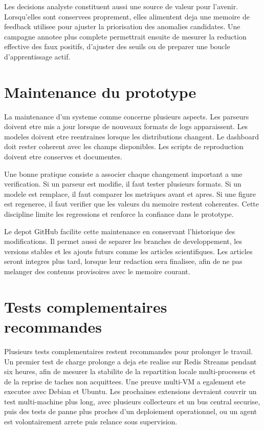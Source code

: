 Les decisions analyste constituent aussi une source de valeur pour l'avenir. Lorsqu'elles sont conservees proprement, elles alimentent deja une memoire de feedback utilisee pour ajuster la priorisation des anomalies candidates. Une campagne annotee plus complete permettrait ensuite de mesurer la reduction effective des faux positifs, d'ajuster des seuils ou de preparer une boucle d'apprentissage actif.

\section{Maintenance du prototype}
La maintenance d'un systeme comme \logminer{} concerne plusieurs aspects. Les parseurs doivent etre mis a jour lorsque de nouveaux formats de logs apparaissent. Les modeles doivent etre reentraines lorsque les distributions changent. Le dashboard doit rester coherent avec les champs disponibles. Les scripts de reproduction doivent etre conserves et documentes.

Une bonne pratique consiste a associer chaque changement important a une verification. Si un parseur est modifie, il faut tester plusieurs formats. Si un modele est remplace, il faut comparer les metriques avant et apres. Si une figure est regeneree, il faut verifier que les valeurs du memoire restent coherentes. Cette discipline limite les regressions et renforce la confiance dans le prototype.

Le depot GitHub facilite cette maintenance en conservant l'historique des modifications. Il permet aussi de separer les branches de developpement, les versions stables et les ajouts futurs comme les articles scientifiques. Les articles seront integres plus tard, lorsque leur redaction sera finalisee, afin de ne pas melanger des contenus provisoires avec le memoire courant.

\section{Tests complementaires recommandes}
Plusieurs tests complementaires restent recommandes pour prolonger le travail. Un premier test de charge prolonge a deja ete realise sur Redis Streams pendant six heures, afin de mesurer la stabilite de la repartition locale multi-processus et de la reprise de taches non acquittees. Une preuve multi-VM a egalement ete executee avec Debian et Ubuntu. Les prochaines extensions devraient couvrir un test multi-machine plus long, avec plusieurs collecteurs et un bus central securise, puis des tests de panne plus proches d'un deploiement operationnel, ou un agent est volontairement arrete puis relance sous supervision.

